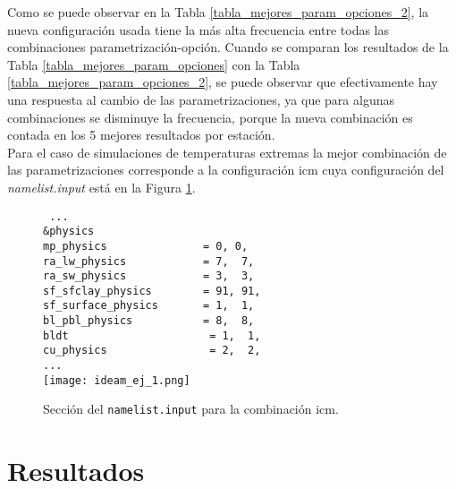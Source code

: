 \begin{itemize}


Como se puede observar en la Tabla \ref{tabla_mejores_param_opciones_2}, la nueva configuración usada tiene la más alta frecuencia entre todas las combinaciones parametrización-opción. Cuando se comparan los resultados de la Tabla \ref{tabla_mejores_param_opciones} con la Tabla \ref{tabla_mejores_param_opciones_2}, se puede observar que efectivamente hay una respuesta al cambio de las parametrizaciones, ya que para algunas combinaciones se disminuye la frecuencia, porque la nueva combinación es contada en los 5 mejores resultados por estación.\\

Para el caso de simulaciones de temperaturas extremas la mejor combinación de las parametrizaciones corresponde a la configuración icm cuya configuración del \textit{namelist.input} está en la Figura \ref{imag_tab_ej3}.\\

\begin{figure}[H]
\center
\texttt{
...\\
\&physics\\
mp\_physics~~~~~~~~~~~~~~~=~0,~0,\\
ra\_lw\_physics~~~~~~~~~~~~=~7,~~7,\\
ra\_sw\_physics~~~~~~~~~~~~=~3,~~3,\\
sf\_sfclay\_physics~~~~~~~~=~91,~91,\\
sf\_surface\_physics~~~~~~~=~1,~~1,\\
bl\_pbl\_physics~~~~~~~~~~~=~8,~~8,\\
bldt~~~~~~~~~~~~~~~~~~~~~~=~1,~~1,\\
cu\_physics~~~~~~~~~~~~~~~~=~2,~~2,\\
...\\
}
\centering
\texttt{[image: ideam\_ej\_1.png]}
\caption{Sección del \texttt{namelist.input} para la combinación icm.}
\label{imag_tab_ej3}


\end{figure}


\section{Resultados}


\end{itemize}

